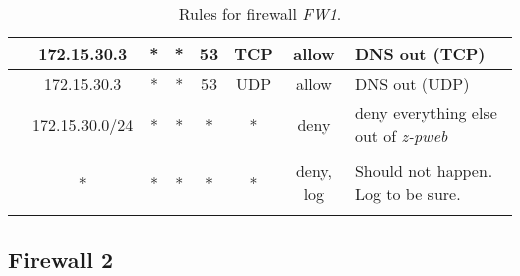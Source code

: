 \documentclass[a4paper, 12pt]{article}
\newcounter{idcounter}
\newcommand\id{\addtocounter{idcounter}{1}\theidcounter}
\begin{document}
\begin{footnotesize}
\begin{longtable}{|l|c|c|c|c|c|c|p{3cm}|}
	        \id & 172.15.30.3 & * & * & 53 & TCP & allow & DNS out (TCP)\\ \hline
	        \id & 172.15.30.3 & * & * & 53 & UDP & allow & DNS out (UDP)\\ \hline
	        \id & 172.15.30.0/24 & * & * & * & * & deny & deny everything else out of \emph{z-pweb}\\ \hline
	        \rowcolor{lightgray}
	        \multicolumn{8}{|c|}{Other}\\ \hline
	        \id & * & * & * & * & * & deny, log & Should not happen. Log to be sure.\\ \hline
	        \caption{Rules for firewall \emph{FW1}.}
	        \label{tab:rules.fw1}
	    \end{longtable}
	\end{footnotesize}
	
	\subsection{Firewall 2}
	
	\setcounter{idcounter}{0}
	
\end{document}
